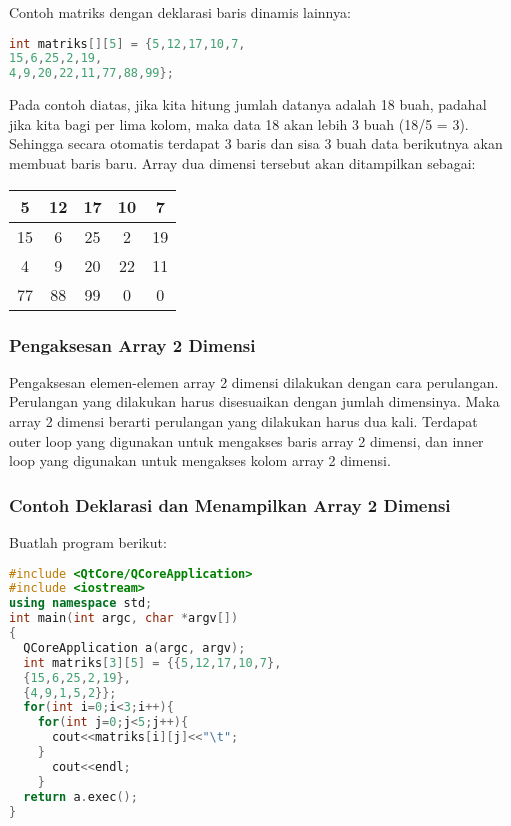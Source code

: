 Contoh matriks dengan deklarasi baris dinamis lainnya:

\begin{lstlisting}[language=c++, numbers=none]
int matriks[][5] = {5,12,17,10,7,
15,6,25,2,19,
4,9,20,22,11,77,88,99};
\end{lstlisting}

Pada contoh diatas, jika kita hitung jumlah datanya adalah 18 buah,
padahal jika kita bagi per lima kolom, maka data 18 akan lebih 3 buah
(18/5 = 3). Sehingga secara otomatis terdapat 3 baris dan sisa 3 buah
data berikutnya akan membuat baris baru. Array dua dimensi tersebut akan
ditampilkan sebagai:


\begin{tabular}{|c|c|c|c|c|}
	\hline
	5 & 12 & 17 & 10 & 7 \\ \hline
	15 & 6 & 25 & 2 & 19 \\ \hline
	4 & 9 & 20 & 22 & 11 \\ \hline
	77 & 88 & 99 & 0 & 0 \\ \hline
	
\end{tabular}

\subsubsection{Pengaksesan Array 2
Dimensi}\label{pengaksesan-array-2-dimensi}

Pengaksesan elemen-elemen array 2 dimensi dilakukan dengan cara
perulangan. Perulangan yang dilakukan harus disesuaikan dengan jumlah
dimensinya. Maka array 2 dimensi berarti perulangan yang dilakukan harus
dua kali. Terdapat outer loop yang digunakan untuk mengakses baris array
2 dimensi, dan inner loop yang digunakan untuk mengakses kolom array 2
dimensi.

\subsubsection*{Contoh  Deklarasi dan Menampilkan Array 2 Dimensi}

Buatlah program berikut:

\begin{lstlisting}[language=c++, caption=Deklarasi dan Menampilkan Array 2 Dimensi, label=contoh3-9]
#include <QtCore/QCoreApplication>
#include <iostream>
using namespace std;
int main(int argc, char *argv[])
{
  QCoreApplication a(argc, argv);
  int matriks[3][5] = {{5,12,17,10,7},
  {15,6,25,2,19},
  {4,9,1,5,2}};
  for(int i=0;i<3;i++){
    for(int j=0;j<5;j++){
      cout<<matriks[i][j]<<"\t";
    }
      cout<<endl;
    }
  return a.exec();
}
\end{lstlisting}

